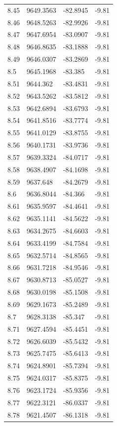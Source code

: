 \begin{table}[H]
\begin{tabular}{llll}
8.45 & 9649.3563 & -82.8945 & -9.81 \\
8.46 & 9648.5263 & -82.9926 & -9.81 \\
8.47 & 9647.6954 & -83.0907 & -9.81 \\
8.48 & 9646.8635 & -83.1888 & -9.81 \\
8.49 & 9646.0307 & -83.2869 & -9.81 \\
8.5 & 9645.1968 & -83.385 & -9.81 \\
8.51 & 9644.362 & -83.4831 & -9.81 \\
8.52 & 9643.5262 & -83.5812 & -9.81 \\
8.53 & 9642.6894 & -83.6793 & -9.81 \\
8.54 & 9641.8516 & -83.7774 & -9.81 \\
8.55 & 9641.0129 & -83.8755 & -9.81 \\
8.56 & 9640.1731 & -83.9736 & -9.81 \\
8.57 & 9639.3324 & -84.0717 & -9.81 \\
8.58 & 9638.4907 & -84.1698 & -9.81 \\
8.59 & 9637.648 & -84.2679 & -9.81 \\
8.6 & 9636.8044 & -84.366 & -9.81 \\
8.61 & 9635.9597 & -84.4641 & -9.81 \\
8.62 & 9635.1141 & -84.5622 & -9.81 \\
8.63 & 9634.2675 & -84.6603 & -9.81 \\
8.64 & 9633.4199 & -84.7584 & -9.81 \\
8.65 & 9632.5714 & -84.8565 & -9.81 \\
8.66 & 9631.7218 & -84.9546 & -9.81 \\
8.67 & 9630.8713 & -85.0527 & -9.81 \\
8.68 & 9630.0198 & -85.1508 & -9.81 \\
8.69 & 9629.1673 & -85.2489 & -9.81 \\
8.7 & 9628.3138 & -85.347 & -9.81 \\
8.71 & 9627.4594 & -85.4451 & -9.81 \\
8.72 & 9626.6039 & -85.5432 & -9.81 \\
8.73 & 9625.7475 & -85.6413 & -9.81 \\
8.74 & 9624.8901 & -85.7394 & -9.81 \\
8.75 & 9624.0317 & -85.8375 & -9.81 \\
8.76 & 9623.1724 & -85.9356 & -9.81 \\
8.77 & 9622.3121 & -86.0337 & -9.81 \\
8.78 & 9621.4507 & -86.1318 & -9.81 \\

\end{tabular}
\end{table}
